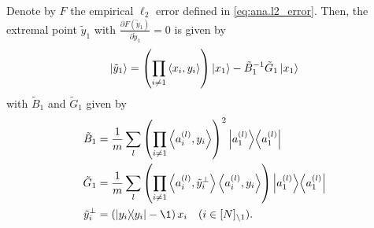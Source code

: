 \begin{lemma}%
  \label{lem:ana.gradient_of_error}
  Denote by $F$ the empirical $\ell_2$ error defined in \cref{eq:ana.l2_error}.
  Then, the extremal point $\tilde y_1$ with $\frac{\partial F(\tilde y_1)}{\partial \tilde y_1} = 0$ is given by
  \[
    \Ket{\tilde y_1} = {\left( \prod_{i \neq 1} \Braket{x_i, y_i} \right)} \Ket{x_1} - \tilde B_1^{-1} \tilde G_1 \Ket{x_1}
    \label{eq:ana.gradient_of_error}
  \]
  with $\tilde B_1$ and $\tilde G_1$ given by
  \begin{align}
    \label{eq:ana.b_operator}
    \tilde B_1 &= \frac{1}{m} \sum_l {\left( \prod_{i \neq 1} \Braket{a\ind{l}_i,y_i} \right)}^2 \Ketbra{a\ind{l}_1} \\
    \label{eq:ana.g_operator}
    \tilde G_1 &= \frac{1}{m} \sum_l {\left( \prod_{i \neq 1} \Braket{a\ind{l}_i, \tilde y_i^\perp} \Braket{a\ind{l}_i,y_i} \right)}\Ketbra{a\ind{l}_1} \\
    \tilde y_i^\perp &= \left(\ketbra{y_i} - \1 \right) x_i \quad(i \in \NsetSub{1}).
  \end{align}
\end{lemma}
